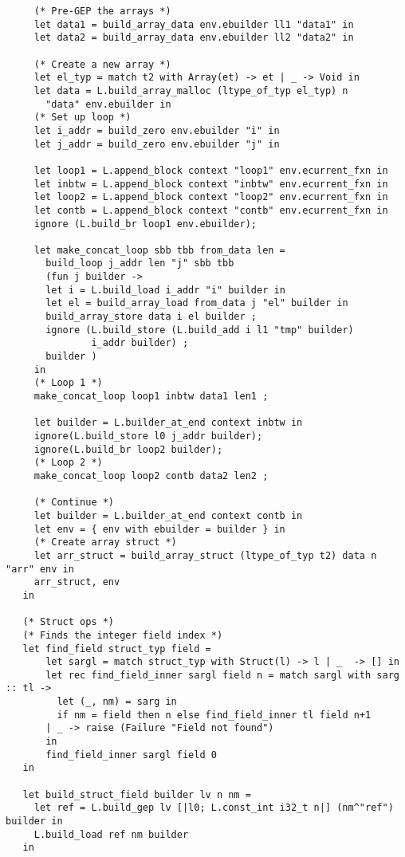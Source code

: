 \documentclass[main.tex]{subfiles}
\begin{document}
\begin{lstlisting}
     (* Pre-GEP the arrays *)
     let data1 = build_array_data env.ebuilder ll1 "data1" in
     let data2 = build_array_data env.ebuilder ll2 "data2" in

     (* Create a new array *)
     let el_typ = match t2 with Array(et) -> et | _ -> Void in
     let data = L.build_array_malloc (ltype_of_typ el_typ) n
       "data" env.ebuilder in 
     (* Set up loop *)
     let i_addr = build_zero env.ebuilder "i" in
     let j_addr = build_zero env.ebuilder "j" in

     let loop1 = L.append_block context "loop1" env.ecurrent_fxn in
     let inbtw = L.append_block context "inbtw" env.ecurrent_fxn in
     let loop2 = L.append_block context "loop2" env.ecurrent_fxn in
     let contb = L.append_block context "contb" env.ecurrent_fxn in
     ignore (L.build_br loop1 env.ebuilder);

     let make_concat_loop sbb tbb from_data len =
       build_loop j_addr len "j" sbb tbb
       (fun j builder ->
       let i = L.build_load i_addr "i" builder in
       let el = build_array_load from_data j "el" builder in
       build_array_store data i el builder ;
       ignore (L.build_store (L.build_add i l1 "tmp" builder)
               i_addr builder) ;
       builder )
     in
     (* Loop 1 *)
     make_concat_loop loop1 inbtw data1 len1 ;
     
     let builder = L.builder_at_end context inbtw in
     ignore(L.build_store l0 j_addr builder);
     ignore(L.build_br loop2 builder);
     (* Loop 2 *)
     make_concat_loop loop2 contb data2 len2 ;

     (* Continue *)
     let builder = L.builder_at_end context contb in
     let env = { env with ebuilder = builder } in
     (* Create array struct *)
     let arr_struct = build_array_struct (ltype_of_typ t2) data n "arr" env in
     arr_struct, env
   in

   (* Struct ops *)
   (* Finds the integer field index *)
   let find_field struct_typ field = 
       let sargl = match struct_typ with Struct(l) -> l | _  -> [] in
       let rec find_field_inner sargl field n = match sargl with sarg :: tl ->
         let (_, nm) = sarg in
         if nm = field then n else find_field_inner tl field n+1
       | _ -> raise (Failure "Field not found")
       in
       find_field_inner sargl field 0
   in

   let build_struct_field builder lv n nm =
     let ref = L.build_gep lv [|l0; L.const_int i32_t n|] (nm^"ref") builder in
     L.build_load ref nm builder
   in     


\end{lstlisting}
\end{document}

